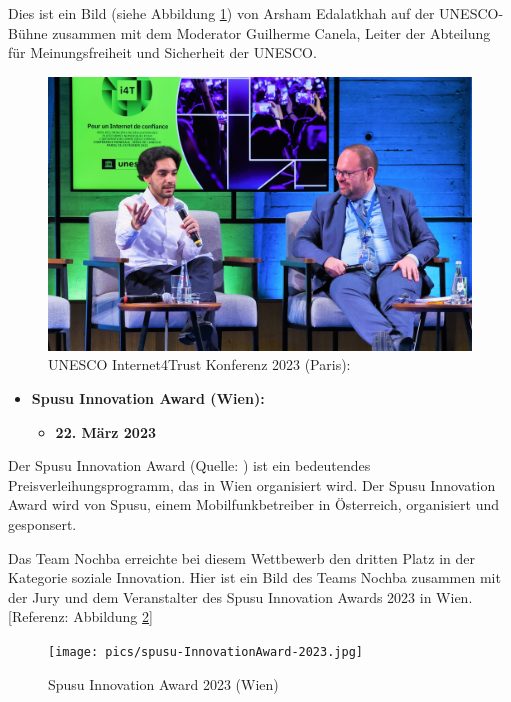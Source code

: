 Dies ist ein Bild (siehe Abbildung \ref{fig:unesco-internet4trust-2023}) von Arsham Edalatkhah auf der UNESCO-Bühne zusammen mit dem Moderator Guilherme Canela, Leiter der Abteilung für Meinungsfreiheit und Sicherheit der UNESCO.

\begin{figure}[H]
    \centering
    \includegraphics[width=1\textwidth]{pics/unesco-internet4trust-2023.jpg}
    \caption{UNESCO Internet4Trust Konferenz 2023 (Paris):}
    \label{fig:unesco-internet4trust-2023}
\end{figure}

\begin{itemize}
    \item \textbf{Spusu Innovation Award (Wien):}
          \begin{itemize}
              \item \textbf{22. März 2023}
          \end{itemize}
\end{itemize}

Der Spusu Innovation Award (Quelle: \cite{spusu-innovation-award} ) ist ein bedeutendes Preisverleihungsprogramm, das in Wien organisiert wird. Der Spusu Innovation Award wird von Spusu, einem Mobilfunkbetreiber in Österreich, organisiert und gesponsert.

Das Team Nochba erreichte bei diesem Wettbewerb den dritten Platz in der Kategorie soziale Innovation. Hier ist ein Bild des Teams Nochba zusammen mit der Jury und dem Veranstalter des Spusu Innovation Awards 2023 in Wien. [Referenz: Abbildung \ref{fig:spusu-InnovationAward-2023}]

\begin{figure}[H]
    \centering
    \texttt{[image: pics/spusu-InnovationAward-2023.jpg]}
    \caption{Spusu Innovation Award 2023 (Wien)}
    \label{fig:spusu-InnovationAward-2023}
\end{figure}


